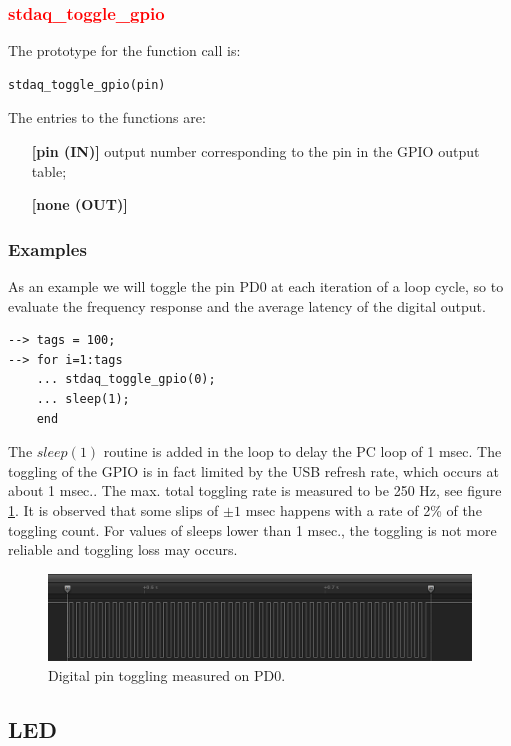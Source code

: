 \documentclass[letterpaper,10pt,english]{hitec}
\begin{document}
\subsubsection{\textcolor{red}{stdaq\_toggle\_gpio}}
The prototype for the function call is: 
\begin{verbatim}
stdaq_toggle_gpio(pin)
\end{verbatim}
The entries to the functions are:
\begin{itemize}
\item [\textbf{[pin (IN)]}] output number corresponding to the pin in the GPIO output table;
\item [\textbf{[none (OUT)]}]
\end{itemize}

\subsubsection{Examples}

As an example we will toggle the pin PD0 at each iteration of a loop cycle, so to evaluate the frequency response and the average latency of the digital output.

\begin{verbatim}
--> tags = 100;
--> for i=1:tags
    ... stdaq_toggle_gpio(0);
    ... sleep(1);
    end
\end{verbatim}
The $sleep(1)$ routine is added in the loop to delay the PC loop of 1 msec. 
The toggling of the GPIO is in fact limited by the USB refresh rate, which occurs at about 1 msec..
The max. total toggling rate is measured to be 250 Hz, see figure \ref{fig:gpio_example}. It is observed that some slips of $\pm 1$ msec happens with a rate of 2\% of the toggling count. 
For values of sleeps lower than 1 msec., the toggling is not more reliable and toggling loss may occurs.

\begin{figure}[ht!]
\includegraphics[scale=0.8]{../img/gpio_example.png}
\caption{Digital pin toggling measured on PD0.}
\label{fig:gpio_example}
\end{figure}


\hrulefill

\subsection{LED}
\end{document}
